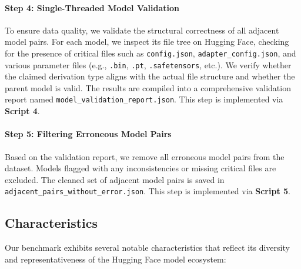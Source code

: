 \paragraph{Step 4: Single-Threaded Model Validation}
To ensure data quality, we validate the structural correctness of all adjacent model pairs. For each model, we inspect its file tree on Hugging Face, checking for the presence of critical files such as \texttt{config.json}, \texttt{adapter\_config.json}, and various parameter files (e.g., \texttt{.bin}, \texttt{.pt}, \texttt{.safetensors}, etc.). We verify whether the claimed derivation type aligns with the actual file structure and whether the parent model is valid. The results are compiled into a comprehensive validation report named \texttt{model\_validation\_report.json}. This step is implemented via \textbf{Script 4}.

\paragraph{Step 5: Filtering Erroneous Model Pairs}
Based on the validation report, we remove all erroneous model pairs from the dataset. Models flagged with any inconsistencies or missing critical files are excluded. The cleaned set of adjacent model pairs is saved in \texttt{adjacent\_pairs\_without\_error.json}. This step is implemented via \textbf{Script 5}.

\subsection{Characteristics}

Our benchmark exhibits several notable characteristics that reflect its diversity and representativeness of the Hugging Face model ecosystem:

